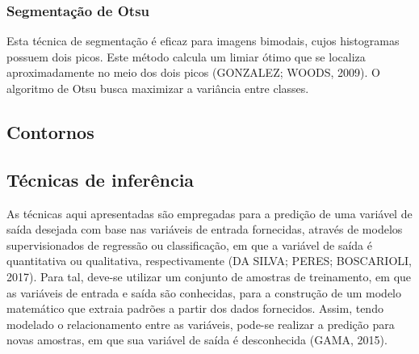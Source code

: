 

\subsubsection{Segmentação de Otsu}

Esta técnica de segmentação é eficaz para imagens bimodais, cujos histogramas possuem dois picos. Este método calcula um limiar ótimo que se localiza aproximadamente no meio dos dois picos (GONZALEZ; WOODS, 2009). O algoritmo de Otsu busca maximizar a variância entre classes. 

\subsection{Contornos}

\subsection{Técnicas de inferência}

As técnicas aqui apresentadas são empregadas para a predição de uma variável de saída desejada com base nas variáveis de entrada fornecidas, através de modelos supervisionados de regressão ou classificação, em que a variável de saída é quantitativa ou qualitativa, respectivamente (DA SILVA; PERES; BOSCARIOLI, 2017). Para tal, deve-se utilizar um conjunto de amostras de treinamento, em que as variáveis de entrada e saída são conhecidas, para a construção de um modelo matemático que extraia padrões a partir dos dados fornecidos. Assim, tendo modelado o relacionamento entre as variáveis, pode-se realizar a predição para novas amostras, em que sua variável de saída é desconhecida (GAMA, 2015).


